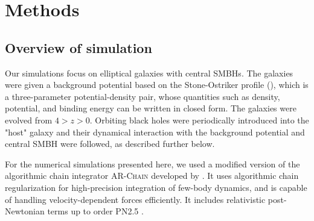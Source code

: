 \documentclass[english, apj]{emulateapj}
\begin{document}
\section{Methods}\label{sec:methods}

\subsection{Overview of simulation}
Our simulations focus on elliptical galaxies with central SMBHs. The galaxies were given a background potential based on the Stone-Ostriker profile (\citet{2015ApJ...806L..28S}), which is a three-parameter potential-density pair, whose quantities such as density, potential, and binding energy can be written in closed form.  The galaxies were evolved from $4 > z > 0$.  Orbiting black holes were periodically introduced into the "host" galaxy and their dynamical interaction with the background potential and central SMBH were followed, as described further below.

For the numerical simulations presented here, we used a modified version of the algorithmic chain integrator \textsc{AR-Chain} developed by \citet{2006MNRAS.372..219M}. It uses algorithmic chain regularization for high-precision integration of few-body dynamics, and is capable of handling velocity-dependent forces efficiently. It includes relativistic post-Newtonian terms up to order PN2.5 \citep{2008AJ....135.2398M}.
\end{document}
